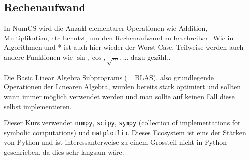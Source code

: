 \newsection
\subsection{Rechenaufwand}
In NumCS wird die Anzahl elementarer Operationen wie Addition, Multiplikation, etc benutzt, um den Rechenaufwand zu beschreiben. 
Wie in Algorithmen und * ist auch hier wieder \tco{\ldots} der Worst Case.
Teilweise werden auch andere Funktionen wie $\sin, \cos, \sqrt{\ldots}, \ldots$ dazu gezählt.

Die Basic Linear Algebra Subprograms (= BLAS), also grundlegende Operationen der Linearen Algebra, wurden bereits stark optimiert und sollten wann immer möglich verwendet werden und man sollte auf keinen Fall diese selbst implementieren.

Dieser Kurs verwendet \texttt{numpy}, \texttt{scipy}, \texttt{sympy} (collection of implementations for symbolic computations) und \texttt{matplotlib}.
Dieses Ecosystem ist eine der Stärken von Python und ist interessanterweise zu einem Grossteil nicht in Python geschrieben, da dies sehr langsam wäre.
